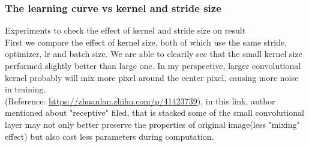 \documentclass[11pt, a4paper]{article} %
\begin{document}
\subsubsection{The learning curve vs kernel and stride size}
{\Large Experiments to check the effect of kernel and stride size on result}
\\ First we compare the effect of kernel size, both of which use the same stride, optimizer, lr and batch size.
We are able to clearily see that the small kernel size performed slightly better than large one. In my perspective, larger convolutional kernel probably will mix more pixel around the center pixel, causing more noise in training.
\\ (Reference: \url{https://zhuanlan.zhihu.com/p/41423739}), in this link, author mentioned about "receptive" filed, that is stacked some of the small convolutional layer may not only better preserve the properties of original image(less "mixing" effect) but also cost less parameters during computation. 
\end{document}
